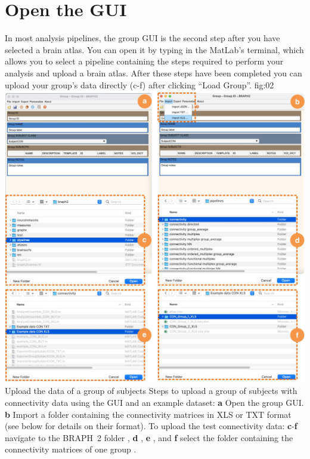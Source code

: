 \documentclass[justified]{tufte-handout}
\begin{document}
\section{Open the GUI}

In most analysis pipelines, the group GUI is the second step after you have selected a brain atlas. You can open it by typing  in the MatLab's terminal, which allows you to select a pipeline containing the steps required to perform your analysis and upload a brain atlas. After these steps have been completed you can upload your group's data directly (c-f) after clicking ``Load Group''. 
	{fig:02}
	{
	\includegraphics{fig02.jpg}
	}
	{Upload the data of a group of subjects}
	{
	Steps to upload a group of subjects with connectivity data using the GUI and an example dataset: 
	{\bf a} Open the group GUI.
	{\bf b} Import a folder containing the connectivity matrices in XLS or TXT format (see below for details on their format).
	To upload the test connectivity data:
	{\bf c}-{\bf f} navigate to the BRAPH~2 folder , {\bf d} ,  {\bf e} , and {\bf f} select the folder containing the connectivity matrices of one group .
	}
\end{document}
